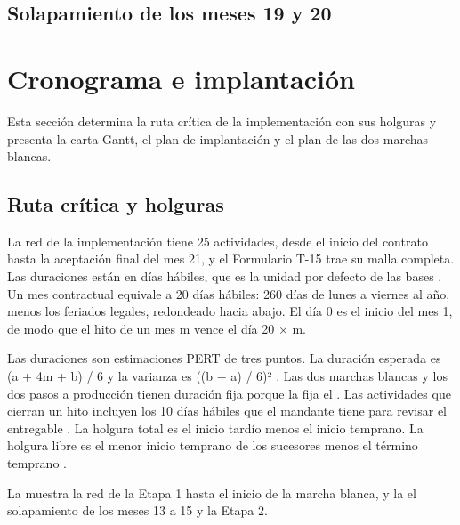 \subsection{Solapamiento de los meses 19 y 20}\label{sec:7-solapamiento-19-20}


\section{Cronograma e implantación}\label{sec:7-cronograma}

Esta sección determina la ruta crítica de la implementación con sus holguras y presenta la carta
Gantt, el plan de implantación y el plan de las dos marchas blancas.

\subsection{Ruta crítica y holguras}\label{sec:7-ruta}

La red de la implementación tiene 25 actividades, desde el inicio del contrato hasta la aceptación
final del mes 21, y el Formulario T-15 trae su malla completa. Las duraciones están en días hábiles,
que es la unidad por defecto de las bases . Un mes contractual equivale a 20 días
hábiles: 260 días de lunes a viernes al año, menos los feriados legales, redondeado hacia abajo. El
día 0 es el inicio del mes 1, de modo que el hito de un mes m vence el día 20 × m.

Las duraciones son estimaciones PERT de tres puntos. La duración esperada es (a + 4m + b) / 6 y la
varianza es ((b − a) / 6)² \parencite{malcolm1959}. Las dos marchas blancas y los dos pasos a
producción tienen duración fija porque la fija el . Las actividades que cierran un hito
incluyen los 10 días hábiles que el mandante tiene para revisar el entregable . La
holgura total es el inicio tardío menos el inicio temprano. La holgura libre es el menor inicio
temprano de los sucesores menos el término temprano \parencite{pmi2019}.

La  muestra la red de la Etapa 1 hasta el inicio de la marcha blanca, y la
 el solapamiento de los meses 13 a 15 y la Etapa 2.


